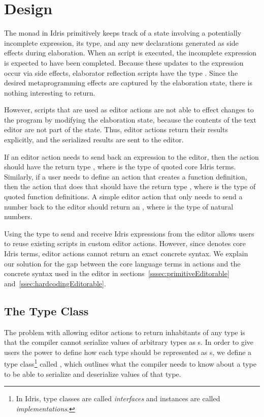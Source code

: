 \section{Design}\label{sec:design}

The \Elab{} monad in Idris primitively keeps track of a state
involving a potentially incomplete expression, its type, and any new declarations generated as
side effects during elaboration.
When an \Elab{} script is executed, the incomplete expression is expected to have been completed.
Because these updates to the expression occur via side effects, elaborator reflection scripts have the type \mbox{}. Since the
desired metaprogramming effects are captured by the elaboration state, there is
nothing interesting to return.

However, \Elab{} scripts that are used as editor actions are not able to effect changes to the program by modifying the elaboration state, because the contents of the text editor are not part of the state.
Thus, editor actions return their results explicitly, and the serialized results are sent to the editor.

If an editor action needs to send back an expression to the editor, then the
action should have the return type \mbox{}, where  is the type of
quoted core Idris terms.
Similarly, if a user needs to define an action that creates a function definition,
then the action that does that should have the return type \mbox{},
where  is the type of quoted function definitions.
A simple editor action that only needs to send a number back
to the editor should return an \mbox{}, where  is the
type of natural numbers.


Using the \TT{} type to send and receive Idris expressions from the editor allows users to reuse existing \Elab{} scripts in
custom editor actions. However, since \TT{} denotes core Idris terms, editor
actions cannot return an exact concrete syntax. We explain our solution for the
gap between the core language terms in \Elab{} actions and the concrete syntax
used in the editor in sections~\ref{sssec:primitiveEditorable}
and~\ref{ssec:hardcodingEditorable}.

\subsection{The \Editorable{} Type Class}
\label{ssec:editorable}

The problem with allowing editor actions to return inhabitants of any
type is that the compiler cannot serialize values of arbitrary types
as \sexp{}s.  In order
to give users the power to define how each type should
be represented as \sexp{}s, we define a type class\footnote{In Idris,
  type classes are called \emph{interfaces} and instances are called
  \emph{implementations}.}  called \Editorable{}, which outlines what
the compiler needs to know about a type to be able to serialize and
deserialize values of that type.

